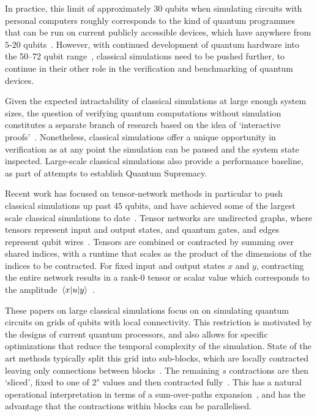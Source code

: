 In practice, this limit of approximately $30$ qubits when simulating circuits with personal computers roughly corresponds to the kind of quantum programmes that can be run on current publicly accessible devices, which have anywhere from $5$-$20$ qubits~\cite{IBMQ,RigettiQPU}. However, with continued development of quantum hardware into the 50--72 qubit range~\cite{IBM50,GoogleBristlecone}, classical simulations need to be pushed further, to continue in their other role in the verification and benchmarking of quantum devices.\par
Given the expected intractability of classical simulations at large enough system sizes, the question of verifying quantum computations without simulation constitutes a separate branch of research based on the idea of `interactive proofs'~\cite{Aharonov2017,Mahadev2018}. Nonetheless, classical simulations offer a unique opportunity in verification as at any point the simulation can be paused and the system state inspected. Large-scale classical simulations also provide a performance baseline, as part of attempts to establish Quantum Supremacy.\par
Recent work has focused on tensor-network methods in particular to push classical simulations up past $45$ qubits, and have achieved some of the largest scale classical simulations to date~\cite{Pendault2017,Chen2018,Chen2018b,Markov2018,Villalonga2019}. Tensor networks are undirected graphs, where tensors represent input and output states, and quantum gates, and edges represent qubit wires~\cite{Boixo2017}. Tensors are combined or contracted by summing over shared indices, with a runtime that scales as the product of the dimensions of the indices to be contracted. For fixed input and output states $x$ and $y$, contracting the entire network results in a rank-0 tensor or scalar value which corresponds to the amplitude $\matrixel{x}{u}{y}$~\cite{Markov2005}.\par
These papers on large classical simulations focus on on simulating quantum circuits on grids of qubits with local connectivity. This restriction is motivated by the designs of current quantum processors, and also allows for specific optimizations that reduce the temporal complexity of the simulation. State of the art methods typically split this grid into sub-blocks, which are locally contracted leaving only connections between blocks~\cite{Pendault2017,Chen2018b,Markov2018,Villalonga2018}. The remaining $s$ contractions are then `sliced', fixed to one of $2^{s}$ values and then contracted fully~\cite{Pendault2017}. This has a natural operational interpretation in terms of a sum-over-paths expansion~\cite{Markov2018}, and has the advantage that the contractions within blocks can be parallelised.\par
